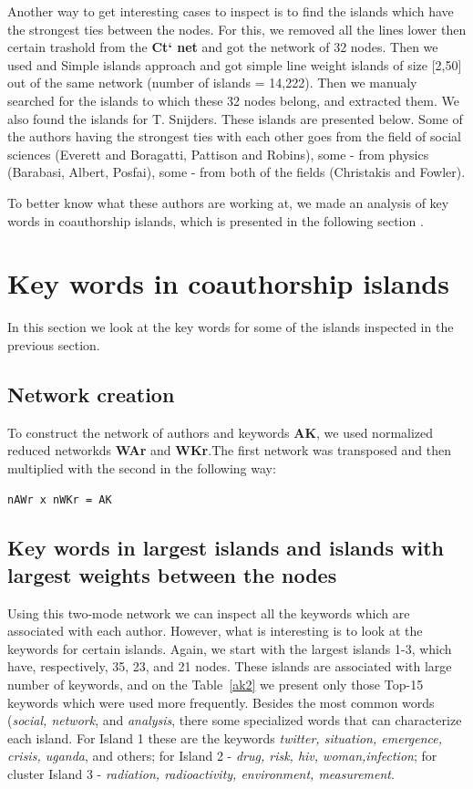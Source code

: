 \documentclass[11pt]{article} %
\newcommand{\Remark}[1]{\ifodd\value{page} \normalmarginpar
 \else \reversemarginpar \fi \marginpar{{\footnotesize #1}} }
\begin{document}
Another way to get interesting cases to inspect is to find the islands which have the strongest ties between the nodes. For this, we removed all the lines lower then certain trashold from the \textbf{Ct` net} and got the network of 32 nodes. Then we used and Simple islands approach and got simple line weight islands of size [2,50] out of the same network (number of islands = 14,222). Then we manualy searched for the islands to which these 32 nodes belong, and extracted them. We also found the islands for T. Snijders. These islands are presented below. Some of the authors having the strongest ties with each other goes from the field of social sciences (Everett and Boragatti, Pattison and Robins), some - from physics (Barabasi, Albert, Posfai), some - from both of the fields (Christakis and Fowler). \medskip

To better know what these authors are working at, we made an analysis of key words in coauthorship islands, which is presented in the following section \Remark{picture fromCt`\_largest line weights.net (100 nodes)}.  \medskip


\section{Key words in coauthorship islands}

In this section we look at the key words for some of the islands inspected in the previous section. 

\subsection{Network creation}  

To construct the network of authors and keywords \textbf{AK}, we used normalized reduced networkds \textbf{WAr} and \textbf{WKr}.The first network was transposed and then multiplied with the second in the following way: \medskip

\texttt{nAWr x nWKr = AK}

\subsection{Key words in largest islands and islands with largest weights between the nodes}  

Using this two-mode network we can inspect all the keywords which are associated with each author. However, what is interesting is to look at the keywords for certain islands. Again, we start with the largest islands 1-3, which have, respectively, 35, 23, and 21 nodes. These islands are associated with large number of keywords, and on the Table~\ref{ak2} we present only those Top-15 keywords which were used more frequently. Besides the most common words (\textit{social, network}, and \textit{analysis}, there some specialized words that can characterize each island. For  Island 1 these are the keywords \textit{twitter, situation, emergence, crisis, uganda}, and others; for Island 2 - \textit{drug, risk, hiv, woman,infection}; for cluster Island 3 - \textit{radiation, radioactivity, environment, measurement}.  \medskip
\end{document}
